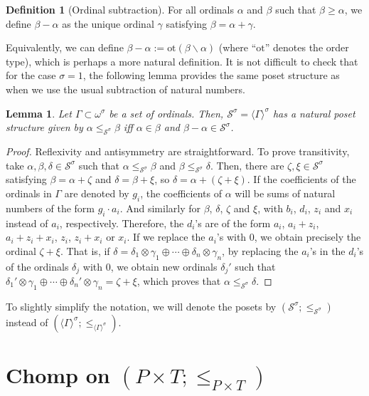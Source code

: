 \documentclass[reqno]{amsart}
\newtheorem{lemma}[theorem]{Lemma}
\theoremstyle{definition}
\theoremstyle{definition}
\newtheorem{definition}[theorem]{Definition}
\theoremstyle{plain} %
\begin{document}
\begin{definition}[Ordinal subtraction]
    For all ordinals $\alpha$ and $\beta$ such that $\beta\geq\alpha$, we define $\beta-\alpha$ as the unique ordinal $\gamma$ satisfying $\beta=\alpha+\gamma$.
\end{definition}
Equivalently, we can define $\beta-\alpha:=\text{ot}(\beta\backslash\alpha)$ (where ``$\text{ot}$'' denotes the order type), which is perhaps a more natural definition. It is not difficult to check that for the case $\sigma = 1 $, the following lemma provides the same poset structure as when we use the usual subtraction of natural numbers.
\begin{lemma}\label{lemposetstr}
    Let $\Gamma\subset\omega^\sigma$ be a set of ordinals. Then, $\mathcal{S}^\sigma=\langle \Gamma\rangle^\sigma$ has a natural poset structure given by $\alpha\leq_{\mathcal{S}^\sigma}\beta $ iff $\alpha\in\beta $ and $\beta-\alpha\in\mathcal{S}^\sigma $.
\end{lemma}\begin{proof} Reflexivity and antisymmetry are straightforward. To prove transitivity, take $\alpha,\beta,\delta\in\mathcal{S}^\sigma$ such that $\alpha\leq_{\mathcal{S}^\sigma}\beta$ and $\beta\leq_{\mathcal{S}^\sigma}\delta$. Then, there are $\zeta,\xi\in\mathcal{S}^\sigma$ satisfying $\beta=\alpha+\zeta$ and $\delta=\beta+\xi$, so $\delta=\alpha+(\zeta+\xi)$. If the coefficients of the ordinals in \(\Gamma\) are denoted by \(g_i\), the coefficients of \(\alpha\) will be sums of natural numbers of the form \(g_i \cdot a_i\). And similarly for $\beta$, $\delta$, $\zeta$ and $\xi$, with $b_i$, $d_i$, $z_i$ and $x_i$ instead of $a_i$, respectively. Therefore, the $d_i$'s are of the form $a_i$, $a_i+z_i$, $a_i+z_i+x_i $, $z_i$, $z_i+x_i $ or $x_i$. If we replace the \(a_i\)'s with 0, we obtain precisely the ordinal \(\zeta + \xi\). That is, if \(\delta = \delta_1 \otimes \gamma_1 \oplus \cdots \oplus \delta_n \otimes \gamma_n\), by replacing the \(a_i\)'s in the \(d_i\)'s of the ordinals \(\delta_j\) with 0, we obtain new ordinals \(\delta_j'\) such that 
\(
\delta_1' \otimes \gamma_1 \oplus \cdots \oplus \delta_n' \otimes \gamma_n = \zeta + \xi
\), which proves that $\alpha\leq_{\mathcal{S}^\sigma}\delta$.
 \end{proof}
To slightly simplify the notation, we will denote the posets by $(\mathcal{S}^\sigma;\leq_{\mathcal{S}^\sigma})$ instead of $(\langle \Gamma \rangle^\sigma;\leq_{\langle \Gamma \rangle^\sigma})$.

\section{Chomp on $(P\times T;\leq_{P\times T})$}
\end{document}
